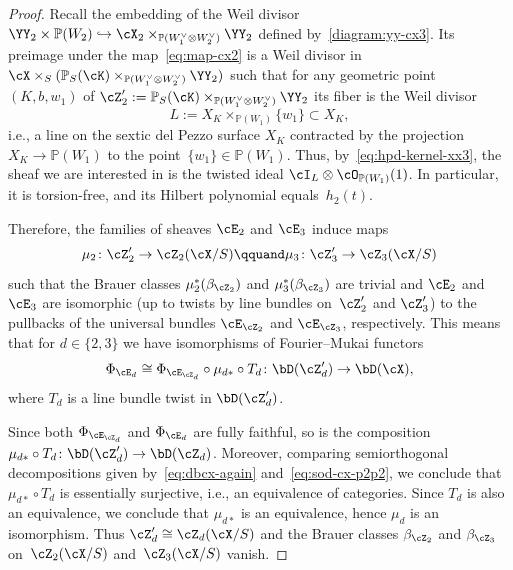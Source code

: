 \documentclass[11pt]{amsart}
\renewcommand{\P}{{\mathbb{P}}}
\theoremstyle{plain}
\theoremstyle{definition}
\theoremstyle{remark}
\begin{document}
\begin{proof}
Recall the embedding of the Weil divisor $\YY_2 \times \P(W_2) \hookrightarrow \cX_2 \times_{\P(W_1^\vee \otimes W_2^\vee)} \YY_2$ defined by~\eqref{diagram:yy-cx3}.
Its preimage under the map~\eqref{eq:map-cx2} is a Weil divisor in $\cX \times_S (\P_S(\cK) \times_{\P(W_1^\vee \otimes W_2^\vee)} \YY_2)$ 
such that for any geometric point~$(K,b,w_1)$ of $\cZ'_2 := \P_S(\cK) \times_{\P(W_1^\vee \otimes W_2^\vee)} \YY_2$ its fiber is the Weil divisor 
\begin{equation*}
L := X_K \times_{\P(W_1)} \{w_1\} \subset X_K,
\end{equation*}
i.e., a line on the sextic del Pezzo surface $X_K$ contracted by the projection $X_K \to \P(W_1)$ to the point~$\{w_1\} \in \P(W_1)$.
Thus, by~\eqref{eq:hpd-kernel-xx3}, the sheaf we are interested in is the twisted ideal $\cI_L \otimes \cO_{\P(W_1)}(1)$.
In particular, it is torsion-free, and its Hilbert polynomial equals~$h_2(t)$.

Therefore, the families of sheaves $\cE_2$ and $\cE_3$ induce maps 
\begin{equation*}
\mu_2 \colon \cZ'_2 \to \cZ_2(\cX/S)
\qquand 
\mu_3 \colon \cZ'_3 \to \cZ_3(\cX/S)
\end{equation*}
such that the Brauer classes $\mu_2^*(\beta_{\cZ_2})$ and $\mu_3^*(\beta_{\cZ_3})$ are trivial 
and $\cE_2$ and $\cE_3$ are isomorphic (up to twists by line bundles on~$\cZ'_2$ and $\cZ'_3$) 
to the pullbacks of the universal bundles $\cE_{\cZ_2}$ and $\cE_{\cZ_3}$, respectively.
This means that for $d \in \{2,3\}$ we have isomorphisms of Fourier--Mukai functors
\begin{equation*}
\Phi_{\cE_{d}} \cong \Phi_{\cE_{\cZ_d}} \circ \mu_{d*} \circ T_d \colon \bD(\cZ'_d) \to \bD(\cX),
\end{equation*}
where $T_d$ is a line bundle twist in $\bD(\cZ'_d)$.

Since both $\Phi_{\cE_{\cZ_d}}$ and $\Phi_{\cE_d}$ are fully faithful, 
so is the composition $\mu_{d*} \circ T_d \colon \bD(\cZ'_d) \to \bD(\cZ_d)$.
Moreover, comparing semiorthogonal decompositions given by~\eqref{eq:dbcx-again} and~\eqref{eq:sod-cx-p2p2}, we conclude that $\mu_{d*} \circ T_d$ is essentially surjective, i.e., an equivalence of categories.
Since $T_d$ is also an equivalence, we conclude that $\mu_{d*}$ is an equivalence, hence $\mu_d$ is an isomorphism.
Thus $\cZ'_d \cong \cZ_d(\cX/S)$ and the Brauer classes $\beta_{\cZ_2}$ and $\beta_{\cZ_3}$  on~$\cZ_2(\cX/S)$ and~$\cZ_3(\cX/S)$ vanish.
\end{proof}
\end{document}
